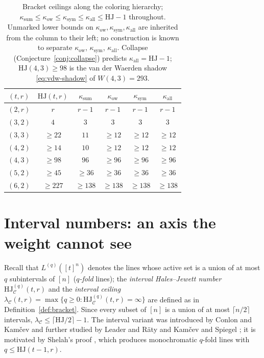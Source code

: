 \documentclass[12pt]{article}
\newcommand{\HJ}{\mathrm{HJ}}
\newcommand{\Wvdw}{W}
\newcommand{\Ls}{L}
\newcommand{\ksum}{\kappa_{\mathrm{sum}}}
\newcommand{\kow}{\kappa_{\mathrm{ow}}}
\newcommand{\ksym}{\kappa_{\mathrm{sym}}}
\newcommand{\kall}{\kappa_{\mathrm{all}}}
\begin{document}
\begin{table}[ht]
\centering
\caption{Bracket ceilings along the coloring hierarchy;
$\ksum\le\kow\le\ksym\le\kall\le\HJ-1$ throughout. Unmarked lower
bounds on $\kow,\ksym,\kall$ are inherited from the column to their
left; no construction is known to separate $\kow$, $\ksym$, $\kall$.
Collapse (Conjecture~\ref{conj:collapse}) predicts $\kall=\HJ-1$;
$\HJ(4,3)\ge 98$ is the van der Waerden shadow \eqref{eq:vdw-shadow} of
$\Wvdw(4,3)=293$.}
\label{tab:ceilings}
\begin{tabular}{@{}cccccc@{}}
\toprule
$(t,r)$ & $\HJ(t,r)$ & $\ksum$ & $\kow$ & $\ksym$ & $\kall$\\
\midrule
$(2,r)$ & $r$      & $r-1$ & $r-1$   & $r-1$   & $r-1$\\
$(3,2)$ & $4$      & $3$   & $3$     & $3$     & $3$\\
$(3,3)$ & $\ge 22$ & $11$  & $\ge 12$ & $\ge 12$ & $\ge 12$\\
$(4,2)$ & $\ge 14$ & $10$  & $\ge 12$ & $\ge 12$ & $\ge 12$\\
$(4,3)$ & $\ge 98$ & $96$  & $\ge 96$ & $\ge 96$ & $\ge 96$\\
$(5,2)$ & $\ge 45$ & $\ge 36$ & $\ge 36$ & $\ge 36$ & $\ge 36$\\
$(6,2)$ & $\ge 227$ & $\ge 138$ & $\ge 138$ & $\ge 138$ & $\ge 138$\\
\bottomrule
\end{tabular}
\end{table}

\section{Interval numbers: an axis the weight cannot see}\label{sec:interval}

Recall that $\Ls^{(q)}([t]^{n})$ denotes the lines whose active set is
a union of at most $q$ subintervals of $[n]$ (\emph{$q$-fold} lines);
the \emph{interval Hales--Jewett number} $\HJ^{(q)}_{\mathcal{C}}(t,r)$
and the \emph{interval ceiling}
$\lambda_{\mathcal{C}}(t,r)=\max\{q\ge 0:\HJ^{(q)}_{\mathcal{C}}(t,r)
=\infty\}$ are defined as in Definition~\ref{def:bracket}. Since every
subset of $[n]$ is a union of at most $\lceil n/2\rceil$ intervals,
$\lambda_{\mathcal{C}}\le\lceil\HJ/2\rceil-1$. The interval variant was
introduced by Conlon and Kam\v{c}ev \cite{conlonAndKamcev} and further
studied by Leader and R\"aty
\cite{leader2018noteintervalshalesjewetttheorem} and Kam\v{c}ev and
Spiegel \cite{kamcev2018noteintervalshalesjewetttheorem}; it is
motivated by Shelah's proof \cite{s.proof_of_HJ}, which produces
monochromatic $q$-fold lines with $q\le\HJ(t-1,r)$.
\end{document}
